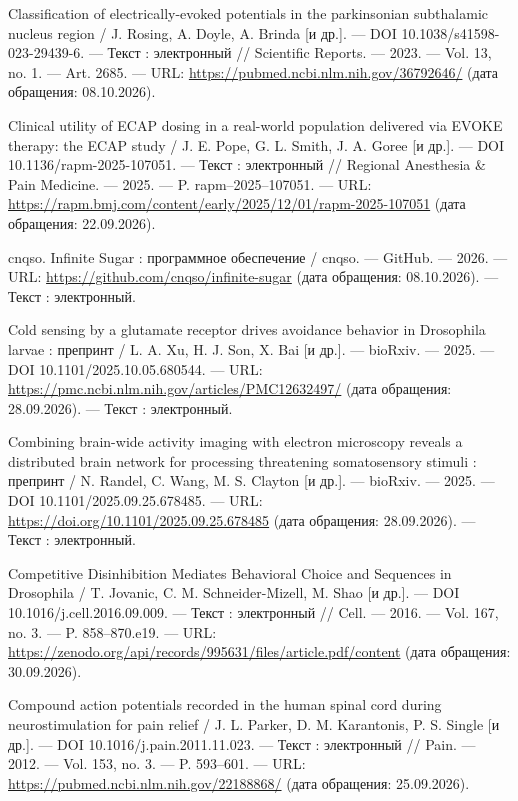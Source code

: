 \begin{list}{}{\setlength{\leftmargin}{10mm}\setlength{\labelwidth}{8mm}\setlength{\labelsep}{2mm}\setlength{\itemsep}{0pt}\setlength{\parsep}{0pt}\setlength{\topsep}{0pt}}
\item[56.] Classification of electrically-evoked potentials in the parkinsonian subthalamic nucleus region / J. Rosing, A. Doyle, A. Brinda [и др.]. — DOI 10.1038/s41598-023-29439-6. — Текст : электронный // Scientific Reports. — 2023. — Vol. 13, no. 1. — Art. 2685. — URL: \url{https://pubmed.ncbi.nlm.nih.gov/36792646/} (дата обращения: 08.10.2026).
\item[57.] Clinical utility of ECAP dosing in a real-world population delivered via EVOKE therapy: the ECAP study / J. E. Pope, G. L. Smith, J. A. Goree [и др.]. — DOI 10.1136/rapm-2025-107051. — Текст : электронный // Regional Anesthesia \& Pain Medicine. — 2025. — P. rapm–2025–107051. — URL: \url{https://rapm.bmj.com/content/early/2025/12/01/rapm-2025-107051} (дата обращения: 22.09.2026).
\item[58.] cnqso. Infinite Sugar : программное обеспечение / cnqso. — GitHub. — 2026. — URL: \url{https://github.com/cnqso/infinite-sugar} (дата обращения: 08.10.2026). — Текст : электронный.
\item[59.] Cold sensing by a glutamate receptor drives avoidance behavior in Drosophila larvae : препринт / L. A. Xu, H. J. Son, X. Bai [и др.]. — bioRxiv. — 2025. — DOI 10.1101/2025.10.05.680544. — URL: \url{https://pmc.ncbi.nlm.nih.gov/articles/PMC12632497/} (дата обращения: 28.09.2026). — Текст : электронный.
\item[60.] Combining brain-wide activity imaging with electron microscopy reveals a distributed brain network for processing threatening somatosensory stimuli : препринт / N. Randel, C. Wang, M. S. Clayton [и др.]. — bioRxiv. — 2025. — DOI 10.1101/2025.09.25.678485. — URL: \url{https://doi.org/10.1101/2025.09.25.678485} (дата обращения: 28.09.2026). — Текст : электронный.
\item[61.] Competitive Disinhibition Mediates Behavioral Choice and Sequences in Drosophila / T. Jovanic, C. M. Schneider-Mizell, M. Shao [и др.]. — DOI 10.1016/j.cell.2016.09.009. — Текст : электронный // Cell. — 2016. — Vol. 167, no. 3. — P. 858–870.e19. — URL: \url{https://zenodo.org/api/records/995631/files/article.pdf/content} (дата обращения: 30.09.2026).
\item[62.] Compound action potentials recorded in the human spinal cord during neurostimulation for pain relief / J. L. Parker, D. M. Karantonis, P. S. Single [и др.]. — DOI 10.1016/j.pain.2011.11.023. — Текст : электронный // Pain. — 2012. — Vol. 153, no. 3. — P. 593–601. — URL: \url{https://pubmed.ncbi.nlm.nih.gov/22188868/} (дата обращения: 25.09.2026).

\end{list}

